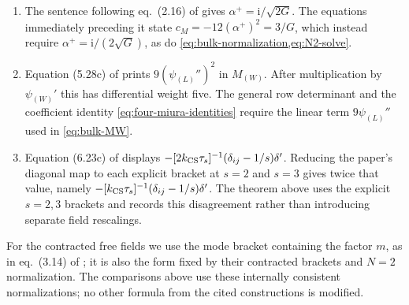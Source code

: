 \documentclass[11pt,a4paper]{article}
\numberwithin{equation}{section}
\theoremstyle{remark}
\newcommand{\ii}{\mathrm{i}}
\begin{document}
\begin{enumerate}[label=(\roman*)]
\item The sentence following eq.~(2.16) of \cite{FredenhagenHoerl} gives
$\alpha^+=\ii/\sqrt{2G}$.  The equations immediately preceding it state
$c_M=-12(\alpha^+)^2=3/G$, which instead require
$\alpha^+=\ii/(2\sqrt G)$, as do \cref{eq:bulk-normalization,eq:N2-solve}.

\item Equation (5.28c) of \cite{DArcyDelfanteFredenhagen} prints
$9(\psi_{(L)}'')^2$ in $M_{(W)}$.  After multiplication by $\psi_{(W)}'$ this has differential
weight five.  The general row determinant and the coefficient identity
\cref{eq:four-miura-identities} require the linear term $9\psi_{(L)}''$ used in
\cref{eq:bulk-MW}.

\item Equation (6.23c) of \cite{DArcyDelfanteFredenhagen} displays
$-[2k_{\rm CS}\tau_s]^{-1}(\delta_{ij}-1/s)\delta'$.  Reducing the paper's diagonal map to
each explicit bracket at $s=2$ and $s=3$ gives twice that value, namely
$-[k_{\rm CS}\tau_s]^{-1}(\delta_{ij}-1/s)\delta'$.  The theorem above uses the explicit
$s=2,3$ brackets and records this disagreement rather than introducing separate field
rescalings.
\end{enumerate}

For the contracted free fields we use the mode bracket containing the factor $m$, as in
eq.~(3.14) of \cite{FredenhagenHoerl}; it is also the form fixed by their contracted brackets
and $N=2$ normalization.  The comparisons above use these internally consistent
normalizations; no other formula from the cited constructions is modified.
\end{document}
